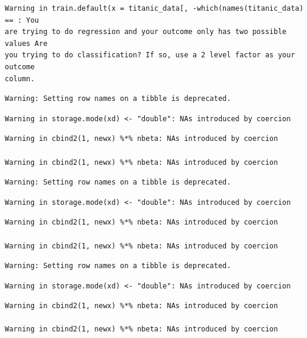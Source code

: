 \documentclass[
  letterpaper,
  DIV=11,
  numbers=noendperiod]{scrartcl}
\begin{document}
\begin{verbatim}
Warning in train.default(x = titanic_data[, -which(names(titanic_data) == : You
are trying to do regression and your outcome only has two possible values Are
you trying to do classification? If so, use a 2 level factor as your outcome
column.
\end{verbatim}

\begin{verbatim}
Warning: Setting row names on a tibble is deprecated.
\end{verbatim}

\begin{verbatim}
Warning in storage.mode(xd) <- "double": NAs introduced by coercion
\end{verbatim}

\begin{verbatim}
Warning in cbind2(1, newx) %*% nbeta: NAs introduced by coercion

Warning in cbind2(1, newx) %*% nbeta: NAs introduced by coercion
\end{verbatim}

\begin{verbatim}
Warning: Setting row names on a tibble is deprecated.
\end{verbatim}

\begin{verbatim}
Warning in storage.mode(xd) <- "double": NAs introduced by coercion
\end{verbatim}

\begin{verbatim}
Warning in cbind2(1, newx) %*% nbeta: NAs introduced by coercion

Warning in cbind2(1, newx) %*% nbeta: NAs introduced by coercion
\end{verbatim}

\begin{verbatim}
Warning: Setting row names on a tibble is deprecated.
\end{verbatim}

\begin{verbatim}
Warning in storage.mode(xd) <- "double": NAs introduced by coercion
\end{verbatim}

\begin{verbatim}
Warning in cbind2(1, newx) %*% nbeta: NAs introduced by coercion

Warning in cbind2(1, newx) %*% nbeta: NAs introduced by coercion
\end{verbatim}
\end{document}
